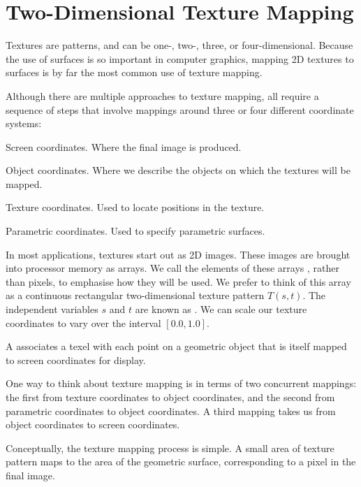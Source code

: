 \documentclass[../COS3712_Notes.tex]{subfiles}
\begin{document}
    \section{Two-Dimensional Texture Mapping}
      Textures are patterns, and can be one-, two-, three, or four-dimensional.
      Because the use of surfaces is so important in computer graphics,
      mapping 2D textures to surfaces is by far the most common use of texture mapping.

      Although there are multiple approaches to texture mapping, all require a sequence
      of steps that involve mappings around three or four different coordinate systems:
      \begin{descriptimize}[nosep]
        \item[Screen coordinates.] Where the final image is produced.
        \item[Object coordinates.] Where we describe the objects on which the textures will
          be mapped.
        \item[Texture coordinates.] Used to locate positions in the texture.
        \item[Parametric coordinates.] Used to specify parametric surfaces.
      \end{descriptimize}

      In most applications, textures start out as 2D images.
      These images are brought into processor memory as arrays.
      We call the elements of these arrays ,
      rather than pixels, to emphasise how they will be used.
      We prefer to think of this array as a continuous rectangular two-dimensional texture pattern
      $T(s, t)$.
      The independent variables $s$ and $t$ are known as .
      We can scale our texture coordinates to vary over the interval $[0.0, 1.0]$.

      A  associates a texel with each point on a geometric object
      that is itself mapped to screen coordinates for display.

      One way to think about texture mapping is in terms of two concurrent mappings:
      the first from texture coordinates to object coordinates,
      and the second from parametric coordinates to object coordinates.
      A third mapping takes us from object coordinates to screen coordinates.

      Conceptually, the texture mapping process is simple.
      A small area of texture pattern maps to the area of the geometric surface,
      corresponding to a pixel in the final image.
\end{document}
